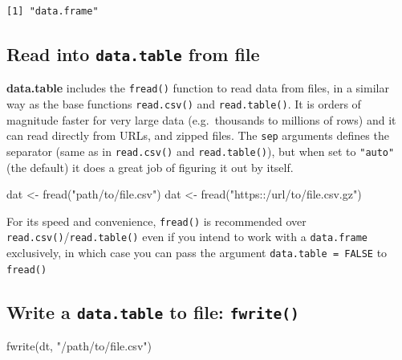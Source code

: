 \documentclass[
]{book}
\newenvironment{Shaded}{\begin{snugshade}}{\end{snugshade}}
\newcommand{\FunctionTok}[1]{\textcolor[rgb]{0.00,0.00,0.00}{#1}}
\newcommand{\NormalTok}[1]{#1}
\newcommand{\OtherTok}[1]{\textcolor[rgb]{0.56,0.35,0.01}{#1}}
\newcommand{\StringTok}[1]{\textcolor[rgb]{0.31,0.60,0.02}{#1}}
\begin{document}
\begin{verbatim}
[1] "data.frame"
\end{verbatim}

\hypertarget{read-into-data.table-from-file}{%
\subsection{\texorpdfstring{Read into \texttt{data.table} from file}{Read into data.table from file}}\label{read-into-data.table-from-file}}

\textbf{data.table} includes the \texttt{fread()} function to read data from files, in a similar way as the base functions \texttt{read.csv()} and \texttt{read.table()}. It is orders of magnitude faster for very large data (e.g.~thousands to millions of rows) and it can read directly from URLs, and zipped files. The \texttt{sep} arguments defines the separator (same as in \texttt{read.csv()} and \texttt{read.table()}), but when set to \texttt{"auto"} (the default) it does a great job of figuring it out by itself.

\begin{Shaded}
\begin{Highlighting}[]
\NormalTok{dat }\OtherTok{\textless{}{-}} \FunctionTok{fread}\NormalTok{(}\StringTok{"path/to/file.csv"}\NormalTok{)}
\NormalTok{dat }\OtherTok{\textless{}{-}} \FunctionTok{fread}\NormalTok{(}\StringTok{"https::/url/to/file.csv.gz"}\NormalTok{)}
\end{Highlighting}
\end{Shaded}

For its speed and convenience, \texttt{fread()} is recommended over \texttt{read.csv()}/\texttt{read.table()} even if you intend to work with a \texttt{data.frame} exclusively, in which case you can pass the argument \texttt{data.table\ =\ FALSE} to \texttt{fread()}

\hypertarget{write-a-data.table-to-file-fwrite}{%
\subsection{\texorpdfstring{Write a \texttt{data.table} to file: \texttt{fwrite()}}{Write a data.table to file: fwrite()}}\label{write-a-data.table-to-file-fwrite}}

\begin{Shaded}
\begin{Highlighting}[]
\FunctionTok{fwrite}\NormalTok{(dt, }\StringTok{"/path/to/file.csv"}\NormalTok{)}
\end{Highlighting}
\end{Shaded}
\end{document}
